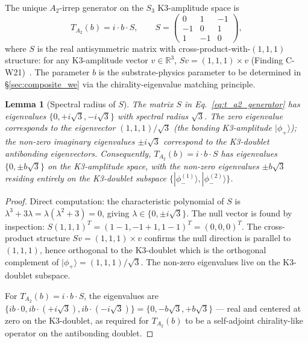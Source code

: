 \documentclass[11pt,letterpaper]{article}
\newtheorem{lemma}[theorem]{Lemma}
\newcommand{\phiminusOne}{|\phi_-^{(1)}\rangle}
\newcommand{\phiminusTwo}{|\phi_-^{(2)}\rangle}
\newcommand{\Sthree}{S_3}
\begin{document}
The unique $A_2$-irrep generator on the $\Sthree$ K3-amplitude space is
\begin{equation}\label{eq:t_a2_generator}
T_{A_2}(b) = i \cdot b \cdot S, \qquad S = \begin{pmatrix} 0 & 1 & -1 \\ -1 & 0 & 1 \\ 1 & -1 & 0 \end{pmatrix},
\end{equation}
where $S$ is the real antisymmetric matrix with cross-product-with-$(1,1,1)$ structure: for any K3-amplitude vector $v \in \mathbb{R}^3$, $S v = (1,1,1) \times v$ (Finding C-W21)~\cite{abshier_capotauro_subclaim_c_sketch}. The parameter $b$ is the substrate-physics parameter to be determined in \S\ref{sec:composite_we} via the chirality-eigenvalue matching principle.

\begin{lemma}[Spectral radius of $S$]\label{lem:spectral_S}
The matrix $S$ in Eq.~\eqref{eq:t_a2_generator} has eigenvalues $\{0, +i\sqrt{3}, -i\sqrt{3}\}$ with spectral radius $\sqrt{3}$. The zero eigenvalue corresponds to the eigenvector $(1,1,1)/\sqrt{3}$ (the bonding K3-amplitude $|\phi_+\rangle$); the non-zero imaginary eigenvalues $\pm i\sqrt{3}$ correspond to the K3-doublet antibonding eigenvectors. Consequently, $T_{A_2}(b) = i \cdot b \cdot S$ has eigenvalues $\{0, \pm b\sqrt{3}\}$ on the K3-amplitude space, with the non-zero eigenvalues $\pm b\sqrt{3}$ residing entirely on the K3-doublet subspace $\{\phiminusOne, \phiminusTwo\}$.
\end{lemma}

\begin{proof}
Direct computation: the characteristic polynomial of $S$ is $\lambda^3 + 3\lambda = \lambda(\lambda^2 + 3) = 0$, giving $\lambda \in \{0, \pm i\sqrt{3}\}$. The null vector is found by inspection: $S(1,1,1)^T = (1-1, -1+1, 1-1)^T = (0,0,0)^T$. The cross-product structure $S v = (1,1,1) \times v$ confirms the null direction is parallel to $(1,1,1)$, hence orthogonal to the K3-doublet which is the orthogonal complement of $|\phi_+\rangle = (1,1,1)/\sqrt{3}$. The non-zero eigenvalues live on the K3-doublet subspace.

For $T_{A_2}(b) = i \cdot b \cdot S$, the eigenvalues are $\{i b \cdot 0, i b \cdot (+i\sqrt{3}), i b \cdot (-i\sqrt{3})\} = \{0, -b\sqrt{3}, +b\sqrt{3}\}$ --- real and centered at zero on the K3-doublet, as required for $T_{A_2}(b)$ to be a self-adjoint chirality-like operator on the antibonding doublet.
\end{proof}
\end{document}
